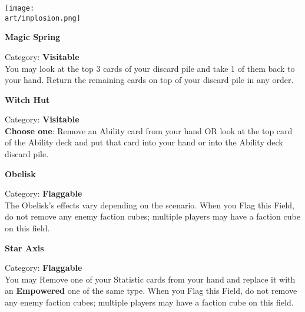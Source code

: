\begin{multicols}{2}
\vfill
\begin{center}
  \texttt{[image: \\art/implosion.png]}
\end{center}

\begin{minipage}{\linewidth}
  \begin{center}
    \textbf{Magic Spring}\medskip
  \end{center}
  \small{Category: \textbf{Visitable}\\
    You may look at the top 3 cards of your discard pile and take 1 of them back to your hand.
    Return the remaining cards on top of your discard pile in any order.}
\end{minipage}

\medskip

\begin{minipage}{\linewidth}
  \begin{center}
    \textbf{Witch Hut}\medskip
  \end{center}
  \small{Category: \textbf{Visitable}\\
    \textbf{Choose one}: Remove an Ability card from your hand OR look at the top card of the Ability deck and put that card into your hand or into the Ability deck discard pile.}
\end{minipage}

\medskip

\begin{minipage}{\linewidth}
  \begin{center}
    \textbf{Obelisk}\medskip
  \end{center}
  \small{Category: \textbf{Flaggable}\\
    The Obelisk's effects vary depending on the scenario.
    When you Flag this Field, do not remove any enemy faction cubes; multiple players may have a faction cube on this field.}
\end{minipage}

\medskip

\begin{minipage}{\linewidth}
  \begin{center}
    \textbf{Star Axis}\medskip
  \end{center}
  \small{Category: \textbf{Flaggable}\\
    You may Remove one of your Statistic cards from your hand and replace it with an \textbf{Empowered} one of the same type.
    When you Flag this Field, do not remove any enemy faction cubes; multiple players may have a faction cube on this field.}
\end{minipage}


\end{multicols}
